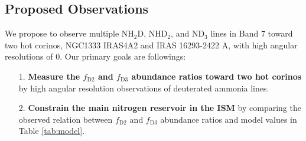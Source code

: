 \documentclass[12pt,a4paper]{article}  %
\newcommand{\ammonia}{NH$_3$\xspace}
\begin{document}




\subsection{Proposed Observations}
We propose to observe multiple NH$_2$D, NHD$_2$, and ND$_3$ lines in Band 7 toward two hot corinos, NGC1333 IRAS4A2 and IRAS 16293-2422 A, with high angular resolutions of 0. Our primary goals are followings:

\begin{enumerate}[leftmargin=*]
    \setlength\itemsep{-0.2em}
    
    \item[1.] \textbf{Measure the $f_\mathrm{D2}$ and $f_\mathrm{D3}$ abundance ratios toward two hot corinos} by high angular resolution observations of deuterated ammonia lines.
    
    \item[2.] \textbf{Constrain the main nitrogen reservoir in the ISM} by comparing the observed relation between $f_\mathrm{D2}$ and $f_\mathrm{D3}$ abundance ratios and model values in Table \ref{tab:model}.
    
\end{enumerate}
\end{document}
